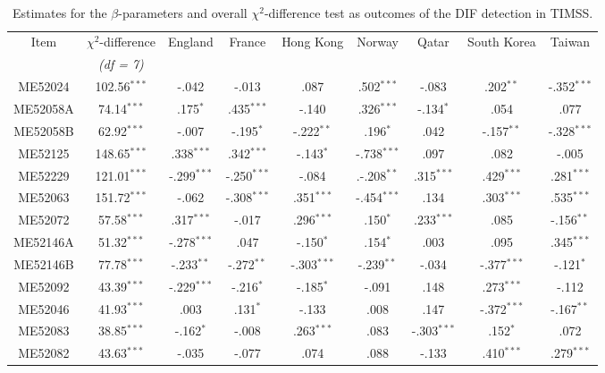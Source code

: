 \documentclass{interact}
\begin{document}
\begin{table}[p]
 \caption{\label{tab:5 detection}\\
 Estimates for the $\beta$-parameters and overall $\chi^2$-difference test as outcomes of the DIF detection in TIMSS.}
    \begin{tabular}{c c | c c c c c c c}
    \hline
     Item & $\chi^2$-difference & England & France & Hong Kong & Norway & Qatar & South Korea & Taiwan\\
      &\textit{(df = 7)} & & & & & & & \\
     \hline
      ME52024 & 102.56$^{***}$ & -.042 & -.013 & .087 & .502$^{***}$ & -.083 & .202$^{**}$ & -.352$^{***}$\\
      ME52058A & 74.14$^{***}$ & .175$^{*}$ & .435$^{***}$ & -.140 & .326$^{***}$ & -.134$^{*}$ & .054 & .077\\
      ME52058B & 62.92$^{***}$ & -.007 & -.195$^{*}$ & -.222$^{**}$ & .196$^{*}$ & .042 & -.157$^{**}$ & -.328$^{***}$\\
      ME52125 & 148.65$^{***}$ & .338$^{***}$ & .342$^{***}$ & -.143$^{*}$ & -.738$^{***}$ & .097 & .082 & -.005 \\
      ME52229 & 121.01$^{***}$ & -.299$^{***}$ & -.250$^{***}$ & -.084 & .-.208$^{**}$ & .315$^{***}$ & .429$^{***}$ & .281$^{***}$\\
      ME52063 & 151.72$^{***}$ & -.062 & -.308$^{***}$ & .351$^{***}$ & -.454$^{***}$ & .134 & .303$^{***}$ & .535$^{***}$\\
      ME52072 & 57.58$^{***}$ & .317$^{***}$ & -.017 & .296$^{***}$ & .150$^{*}$ & .233$^{***}$ & .085 & -.156$^{**}$\\
      ME52146A & 51.32$^{***}$ & -.278$^{***}$ & .047 & -.150$^{*}$ & .154$^{*}$ & .003 & .095 & .345$^{***}$\\
      ME52146B & 77.78$^{***}$ & -.233$^{**}$ & -.272$^{**}$ & -.303$^{***}$ & -.239$^{**}$ & -.034 & -.377$^{***}$ & -.121$^{*}$\\
      ME52092 & 43.39$^{***}$ & -.229$^{***}$ & -.216$^{*}$ & -.185$^{*}$ & -.091 & .148 & .273$^{***}$ & -.112\\
      ME52046 & 41.93$^{***}$ & .003 & .131$^{*}$ & -.133 & .008 & .147 & -.372$^{***}$ & -.167$^{**}$\\
      ME52083 & 38.85$^{***}$ & -.162$^{*}$ & -.008 & .263$^{***}$ & .083 & -.303$^{***}$ & .152$^{*}$ & .072\\
      ME52082 & 43.63$^{***}$ & -.035 & -.077 & .074 & .088 & -.133 & .410$^{***}$ & .279$^{***}$\\

\end{tabular}
\end{table}
\end{document}
